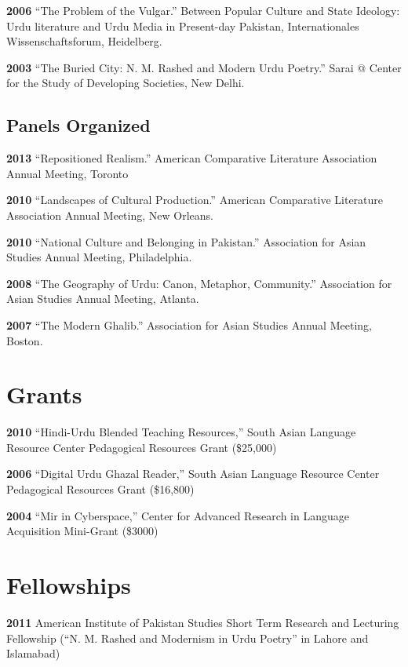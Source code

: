 \documentclass[letterpaper,12pt]{article}
\begin{document}
\textbf{2006}
“The Problem of the Vulgar.”
Between Popular Culture and State Ideology:
Urdu literature and Urdu Media in Present-day Pakistan,
Internationales Wissenschaftsforum, Heidelberg.

\textbf{2003}
“The Buried City: N. M. Rashed and Modern Urdu Poetry.”
Sarai @ Center for the Study of Developing Societies, New Delhi.


\subsection{Panels Organized%
  \label{panels-organized}%
}

\textbf{2013}
“Repositioned Realism.”
American Comparative Literature Association Annual Meeting, Toronto

\textbf{2010}
“Landscapes of Cultural Production.”
American Comparative Literature Association Annual Meeting, New Orleans.

\textbf{2010}
“National Culture and Belonging in Pakistan.”
Association for Asian Studies Annual Meeting, Philadelphia.

\textbf{2008}
“The Geography of Urdu: Canon, Metaphor, Community.”
Association for Asian Studies Annual Meeting, Atlanta.

\textbf{2007}
“The Modern Ghalib.”
Association for Asian Studies Annual Meeting, Boston.


\section{Grants%
  \label{grants}%
}

\textbf{2010}
“Hindi-Urdu Blended Teaching Resources,”
South Asian Language Resource Center Pedagogical Resources Grant (\$25,000)

\textbf{2006}
“Digital Urdu Ghazal Reader,”
South Asian Language Resource Center Pedagogical Resources Grant (\$16,800)

\textbf{2004}
“Mir in Cyberspace,”
Center for Advanced Research in Language Acquisition Mini-Grant (\$3000)


\section{Fellowships%
  \label{fellowships}%
}

\textbf{2011}
American Institute of Pakistan Studies
Short Term Research and Lecturing Fellowship
(“N. M. Rashed and Modernism in Urdu Poetry” in Lahore and Islamabad)
\end{document}
